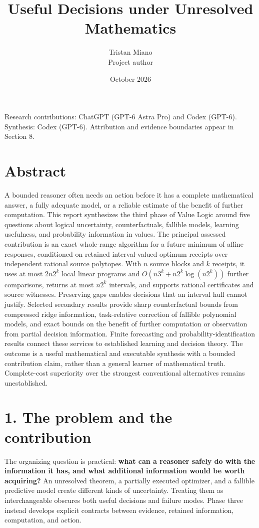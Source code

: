 \documentclass{article}
\title{Useful Decisions under Unresolved Mathematics}
\author{Tristan Miano\\Project author}
\date{October 2026}
\theoremstyle{definition}
\begin{document}
\raggedbottom
\maketitle
\begin{center}\small
Research contributions: ChatGPT (GPT-6 Astra Pro) and Codex (GPT-6).\\
Synthesis: Codex (GPT-6). Attribution and evidence boundaries appear in Section 8.
\end{center}
\section{Abstract}\label{abstract}

A bounded reasoner often needs an action before it has a complete
mathematical answer, a fully adequate model, or a reliable estimate of
the benefit of further computation. This report synthesizes the third
phase of Value Logic around five questions about logical uncertainty,
counterfactuals, fallible models, learning usefulness, and probability
information in values. The principal assessed contribution is an exact
whole-range algorithm for a future minimum of affine responses,
conditioned on retained interval-valued optimum receipts over
independent rational source polytopes. With \(n\) source blocks and
\(k\) receipts, it uses at most \(2n2^k\) local linear programs and
\(O(n3^k+n2^k\log(n2^k))\) further comparisons, returns at most \(n2^k\)
intervals, and supports rational certificates and source witnesses.
Preserving gaps enables decisions that an interval hull cannot justify.
Selected secondary results provide sharp counterfactual bounds from
compressed ridge information, task-relative correction of fallible
polynomial models, and exact bounds on the benefit of further
computation or observation from partial decision information. Finite
forecasting and probability-identification results connect these
services to established learning and decision theory. The outcome is a
useful mathematical and executable synthesis with a bounded contribution
claim, rather than a general learner of mathematical truth.
Complete-cost superiority over the strongest conventional alternatives
remains unestablished.

\section{1. The problem and the contribution}\label{sec-introduction}

The organizing question is practical: \textbf{what can a reasoner safely
do with the information it has, and what additional information would be
worth acquiring?} An unresolved theorem, a partially executed optimizer,
and a fallible predictive model create different kinds of uncertainty.
Treating them as interchangeable obscures both useful decisions and
failure modes. Phase three instead develops explicit contracts between
evidence, retained information, computation, and action.
\end{document}
